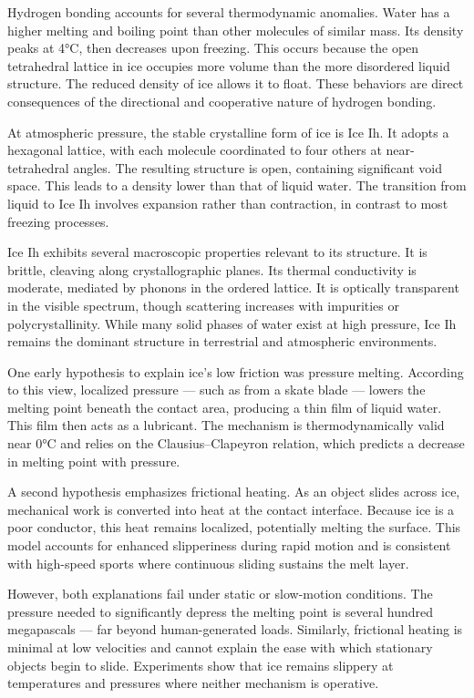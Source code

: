 Hydrogen bonding accounts for several thermodynamic anomalies. Water has a higher melting and boiling point than other molecules of similar mass. Its density peaks at 4°C, then decreases upon freezing. This occurs because the open tetrahedral lattice in ice occupies more volume than the more disordered liquid structure. The reduced density of ice allows it to float. These behaviors are direct consequences of the directional and cooperative nature of hydrogen bonding.

At atmospheric pressure, the stable crystalline form of ice is Ice Ih. It adopts a hexagonal lattice, with each molecule coordinated to four others at near-tetrahedral angles. The resulting structure is open, containing significant void space. This leads to a density lower than that of liquid water. The transition from liquid to Ice Ih involves expansion rather than contraction, in contrast to most freezing processes.

Ice Ih exhibits several macroscopic properties relevant to its structure. It is brittle, cleaving along crystallographic planes. Its thermal conductivity is moderate, mediated by phonons in the ordered lattice. It is optically transparent in the visible spectrum, though scattering increases with impurities or polycrystallinity. While many solid phases of water exist at high pressure, Ice Ih remains the dominant structure in terrestrial and atmospheric environments.

One early hypothesis to explain ice's low friction was pressure melting. According to this view, localized pressure — such as from a skate blade — lowers the melting point beneath the contact area, producing a thin film of liquid water. This film then acts as a lubricant. The mechanism is thermodynamically valid near 0°C and relies on the Clausius–Clapeyron relation, which predicts a decrease in melting point with pressure.

A second hypothesis emphasizes frictional heating. As an object slides across ice, mechanical work is converted into heat at the contact interface. Because ice is a poor conductor, this heat remains localized, potentially melting the surface. This model accounts for enhanced slipperiness during rapid motion and is consistent with high-speed sports where continuous sliding sustains the melt layer.

However, both explanations fail under static or slow-motion conditions. The pressure needed to significantly depress the melting point is several hundred megapascals — far beyond human-generated loads. Similarly, frictional heating is minimal at low velocities and cannot explain the ease with which stationary objects begin to slide. Experiments show that ice remains slippery at temperatures and pressures where neither mechanism is operative.

